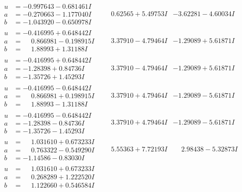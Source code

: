 \documentclass[1p]{elsarticle_modified}
\theoremstyle{definition}
\begin{document}
$$\begin{array}{c|c|c}
\begin{aligned}
u &= -0.997643 - 0.681461 I \\
a &= -0.270663 - 1.177040 I \\
b &= -1.043920 - 0.650978 I\end{aligned}
 & \phantom{-}0.62565 + 5.49753 I & -3.62281 - 4.60034 I \\ \hline\begin{aligned}
u &= -0.416995 + 0.648442 I \\
a &= \phantom{-}0.866981 - 0.198915 I \\
b &= \phantom{-}1.88993 + 1.31188 I\end{aligned}
 & \phantom{-}3.37910 - 4.79464 I & -1.29089 + 5.61871 I \\ \hline\begin{aligned}
u &= -0.416995 + 0.648442 I \\
a &= -1.28398 + 0.84736 I \\
b &= -1.35726 + 1.45293 I\end{aligned}
 & \phantom{-}3.37910 - 4.79464 I & -1.29089 + 5.61871 I \\ \hline\begin{aligned}
u &= -0.416995 - 0.648442 I \\
a &= \phantom{-}0.866981 + 0.198915 I \\
b &= \phantom{-}1.88993 - 1.31188 I\end{aligned}
 & \phantom{-}3.37910 + 4.79464 I & -1.29089 - 5.61871 I \\ \hline\begin{aligned}
u &= -0.416995 - 0.648442 I \\
a &= -1.28398 - 0.84736 I \\
b &= -1.35726 - 1.45293 I\end{aligned}
 & \phantom{-}3.37910 + 4.79464 I & -1.29089 - 5.61871 I \\ \hline\begin{aligned}
u &= \phantom{-}1.031610 + 0.673233 I \\
a &= \phantom{-}0.763322 - 0.549290 I \\
b &= -1.14586 - 0.83030 I\end{aligned}
 & \phantom{-}5.55363 + 7.72193 I & \phantom{-}2.98438 - 5.32873 I \\ \hline\begin{aligned}
u &= \phantom{-}1.031610 + 0.673233 I \\
a &= \phantom{-}0.268289 + 1.222520 I \\
b &= \phantom{-}1.122660 + 0.546584 I\end{aligned}

\end{array}$$
\end{document}
